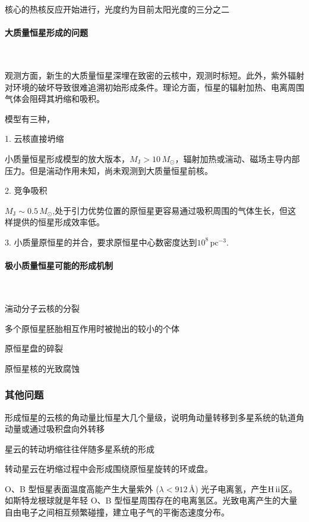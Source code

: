 \documentclass[../天体物理基础.tex]{subfiles}
\begin{document}
核心的热核反应开始进行，光度约为目前太阳光度的三分之二

\paragraph{大质量恒星形成的问题}~{}

观测方面，新生的大质量恒星深埋在致密的云核中，观测时标短。此外，紫外辐射对环境的破坏导致很难追溯初始形成条件。理论方面，恒星的辐射加热、电离周围气体会阻碍其坍缩和吸积。

模型有三种，

1. 云核直接坍缩

小质量恒星形成模型的放大版本，$M_{\text{J}}>10\,M_{\odot}$，辐射加热或湍动、磁场主导内部压力。但是湍动作用未知，尚未观测到大质量恒星前核。

2. 竞争吸积

$M_{\text{J}}\sim0.5\,M_{\odot}$,处于引力优势位置的原恒星更容易通过吸积周围的气体生长，但这样提供的恒星形成效率低。

3. 小质量原恒星的并合，要求原恒星中心数密度达到$10^{8}\,\mathrm{pc^{-3}}$.

\paragraph{极小质量恒星可能的形成机制}~{}

湍动分子云核的分裂

多个原恒星胚胎相互作用时被抛出的较小的个体

原恒星盘的碎裂

原恒星核的光致腐蚀

\subsubsection{其他问题}

形成恒星的云核的角动量比恒星大几个量级，说明角动量转移到多星系统的轨道角动量或通过吸积盘向外转移

星云的转动坍缩往往伴随多星系统的形成

转动星云在坍缩过程中会形成围绕原恒星旋转的环或盘。




O、B 型恒星表面温度高能产生大量紫外 ($\lambda<912\,\si{\angstrom}$) 光子电离氢，产生$\mathrm{H\,\uppercase\expandafter{\romannumeral 2}}$区。如斯特龙根球就是年轻 O、B 型恒星周围存在的电离氢区。光致电离产生的大量自由电子之间相互频繁碰撞，建立电子气的平衡态速度分布。



\end{document}
